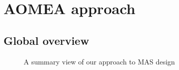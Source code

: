 \documentclass[runningheads]{llncs}
\begin{document}
%



\section{AOMEA approach}



\subsection{Global overview}

\begin{figure}[h!]
    \centering
    
    \caption{A summary view of our approach to MAS design}
    \label{fig:design_approach}
\end{figure}
\end{document}
